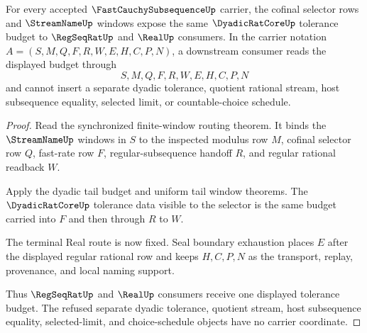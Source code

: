 \begin{theorem}
\label{thm:fast-cauchy-subsequence-cofinal-regular-window}
For every accepted $\FastCauchySubsequenceUp$ carrier, the cofinal selector rows and $\StreamNameUp$ windows expose the same $\DyadicRatCoreUp$ tolerance budget to $\RegSeqRatUp$ and $\RealUp$ consumers. In the carrier notation $A=(S,M,Q,F,R,W,E,H,C,P,N)$, a downstream consumer reads the displayed budget through
$$
S,M,Q,F,R,W,E,H,C,P,N
$$
and cannot insert a separate dyadic tolerance, quotient rational stream, host subsequence equality, selected limit, or countable-choice schedule.
\end{theorem}
\begin{proof}
Read the synchronized finite-window routing theorem. It binds the $\StreamNameUp$ windows in $S$ to the inspected modulus row $M$, cofinal selector row $Q$, fast-rate row $F$, regular-subsequence handoff $R$, and regular rational readback $W$.

Apply the dyadic tail budget and uniform tail window theorems. The $\DyadicRatCoreUp$ tolerance data visible to the selector is the same budget carried into $F$ and then through $R$ to $W$.

The terminal Real route is now fixed. Seal boundary exhaustion places $E$ after the displayed regular rational row and keeps $H,C,P,N$ as the transport, replay, provenance, and local naming support.

Thus $\RegSeqRatUp$ and $\RealUp$ consumers receive one displayed tolerance budget. The refused separate dyadic tolerance, quotient stream, host subsequence equality, selected-limit, and choice-schedule objects have no carrier coordinate.
\end{proof}

